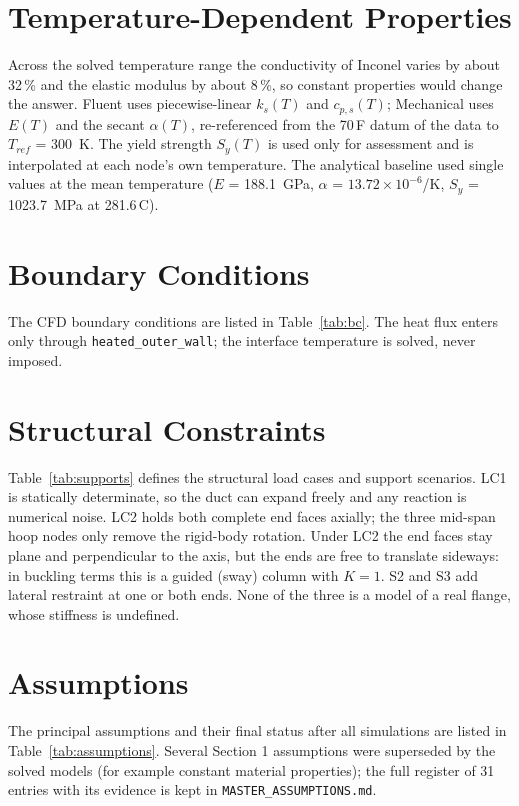 \section{Temperature-Dependent Properties}
Across the solved temperature range the conductivity of Inconel varies by about 32\,\% and the elastic modulus by about 8\,\%, so constant
properties would change the answer. Fluent uses piecewise-linear $k_s(T)$ and $c_{p,s}(T)$; Mechanical uses $E(T)$ and the secant
$\alpha(T)$, re-referenced from the 70\,\textdegree F datum of the data to $T_{ref}$ = 300~K. The yield strength $S_y(T)$ is used only for
assessment and is interpolated at each node's own temperature. The analytical baseline used single values at the mean temperature
($E$ = 188.1~GPa, $\alpha$ = $13.72\times10^{-6}$/K, $S_y$ = 1023.7~MPa at 281.6\,\textdegree C).

\section{Boundary Conditions}
The CFD boundary conditions are listed in Table~\ref{tab:bc}. The heat flux enters only through \texttt{heated\_outer\_wall}; the interface
temperature is solved, never imposed.



\section{Structural Constraints}
Table~\ref{tab:supports} defines the structural load cases and support scenarios. LC1 is statically determinate, so the duct can expand
freely and any reaction is numerical noise. LC2 holds both complete end faces axially; the three mid-span hoop nodes only remove the rigid-body
rotation. Under LC2 the end faces stay plane and perpendicular to the axis, but the ends are free to translate sideways: in buckling terms
this is a guided (sway) column with $K = 1$. S2 and S3 add lateral restraint at one or both ends. None of the three is a model of a real
flange, whose stiffness is undefined.



\section{Assumptions}
The principal assumptions and their final status after all simulations are listed in Table~\ref{tab:assumptions}. Several Section 1
assumptions were superseded by the solved models (for example constant material properties); the full register of 31 entries with its
evidence is kept in \texttt{MASTER\_ASSUMPTIONS.md}.

